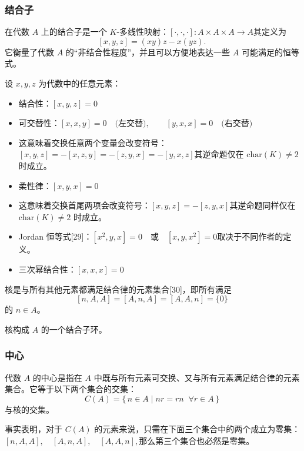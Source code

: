 \subsubsection{结合子}
在代数 $A$ 上的结合子是一个 $K$-多线性映射：$[\cdot,\cdot,\cdot] : A \times A \times A \to A$其定义为
$$
[x,y,z] = (xy)z - x(yz).~
$$
它衡量了代数 $A$ 的“非结合性程度”，并且可以方便地表达一些 $A$ 可能满足的恒等式。

设 $x, y, z$ 为代数中的任意元素：

\begin{itemize}
\item 结合性：$[x,y,z] = 0$
\item 可交替性：$[x,x,y] = 0 \quad \text{(左交替)}, \qquad [y,x,x] = 0 \quad \text{(右交替)}$
\item 这意味着交换任意两个变量会改变符号：$[x,y,z] = -[x,z,y] = -[z,y,x] = -[y,x,z]$其逆命题仅在 $\mathrm{char}(K) \neq 2$ 时成立。
\item 柔性律：$[x,y,x] = 0$
\item 这意味着交换首尾两项会改变符号：$[x,y,z] = -[z,y,x]$其逆命题同样仅在 $\mathrm{char}(K) \neq 2$ 时成立。
\item Jordan 恒等式[29]：$[x^2,y,x] = 0 \quad \text{或} \quad [x,y,x^2] = 0$取决于不同作者的定义。
\item 三次幂结合性：$[x,x,x] = 0$
\end{itemize}
核是与所有其他元素都满足结合律的元素集合[30]，即所有满足
  $$
  [n,A,A] = [A,n,A] = [A,A,n] = \{0\}~
  $$
的 $n \in A$。

核构成 $A$ 的一个结合子环。
\subsubsection{中心}
代数 $A$ 的中心是指在 $A$ 中既与所有元素可交换、又与所有元素满足结合律的元素集合。它等于以下两个集合的交集：
$$
C(A) = \{\, n \in A \mid nr = rn \;\; \forall r \in A \,\}~
$$
与核的交集。

事实表明，对于 $C(A)$ 的元素来说，只需在下面三个集合中的两个成立为零集：$[n, A, A], \quad [A, n, A], \quad [A, A, n],$那么第三个集合也必然是零集。

